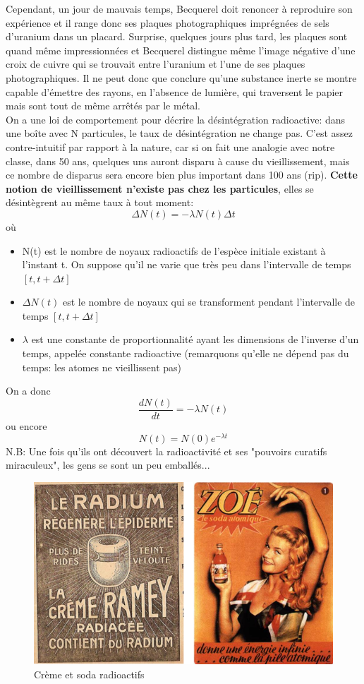 Cependant, un jour de mauvais temps, Becquerel doit renoncer à reproduire son expérience et il range donc ses plaques photographiques imprégnées de sels d'uranium dans un placard. Surprise, quelques jours plus tard, les plaques sont quand même impressionnées et Becquerel distingue même l'image négative d'une croix de cuivre qui se trouvait entre l'uranium et l'une de ses plaques photographiques. Il ne peut donc que conclure qu'une substance inerte se montre capable d'émettre des rayons, en l'absence de lumière, qui traversent le papier mais sont tout de même arrêtés par le métal. \\

On a une loi de comportement pour décrire la désintégration radioactive: dans une boîte avec N particules, le taux de désintégration ne change pas. C'est assez contre-intuitif par rapport à la nature, car si on fait une analogie avec notre classe, dans 50 ans, quelques uns auront disparu à cause du vieillissement, mais ce nombre de disparus sera encore bien plus important dans 100 ans (rip). \textbf{Cette notion de vieillissement n'existe pas chez les particules}, elles se désintègrent au même taux à tout moment: 
\[    \Delta N(t)=-\lambda N(t) \Delta t    \]
où 
\begin{itemize}
    \item N(t) est le nombre de noyaux radioactifs de l'espèce initiale existant à l'instant t. On suppose qu'il ne varie que très peu dans l'intervalle de temps $[t,t+\Delta t]$
    \item $\Delta N(t)$ est le nombre de noyaux qui se transforment pendant l'intervalle de temps $[t,t+\Delta t]$
    \item $\lambda$ est une constante de proportionnalité ayant les dimensions de l'inverse d'un temps, appelée constante radioactive (remarquons qu'elle ne dépend pas du temps: les atomes ne vieillissent pas)
\end{itemize}
On a donc
\[
    \dfrac{dN(t)}{dt}=-\lambda N(t)
\]
ou encore
\[
    N(t)=N(0)e^{-\lambda t}
\]
N.B: Une fois qu'ils ont découvert la radioactivité et ses "pouvoirs curatifs miraculeux", les gens se sont un peu emballés... 

\begin{figure}[H]
    \centering
    \includegraphics[scale=0.60]{Images1/produits.png}
    \caption{Crème et soda radioactifs}
\end{figure}

